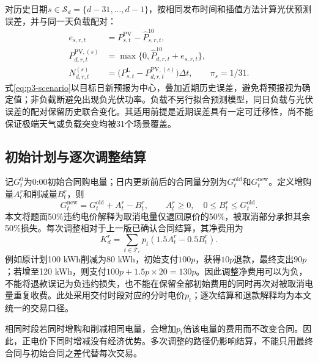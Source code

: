 对历史日期$s\in\mathcal S_d=\{d-31,\ldots,d-1\}$，按相同发布时间和插值方法计算光伏预测误差，并与同一天负载配对：
\begin{align}
e_{s,r,t}&=P^{\mathrm{PV}}_{s,t}-\widehat P^{10}_{s,r,t},\\
P^{\mathrm{PV},(s)}_{d,r,t}&=\max\{0,\widehat P^{10}_{d,r,t}+e_{s,r,t}\},\\
N^{(s)}_{d,r,t}&=\bigl(P^{\mathrm L}_{s,t}-P^{\mathrm{PV},(s)}_{d,r,t}\bigr)\Delta t,
\qquad \pi_s=1/31.\label{eq:p3-scenario}
\end{align}
式\eqref{eq:p3-scenario}以目标日新预报为中心，叠加近期历史误差，避免将预报视为确定值；非负截断避免出现负光伏功率。负载不另行拟合预测模型，同日负载与光伏误差的配对保留历史联合变化。其适用前提是近期误差具有一定可迁移性，尚不能保证极端天气或负载突变均被31个场景覆盖。

\subsection{初始计划与逐次调整结算}
记$G^0_t$为0:00初始合同购电量；日内更新前后的合同量分别为$G^{\mathrm{old}}_t$和$G^{\mathrm{new}}_t$。定义增购量$A^r_t$和削减量$B^r_t$，则
\begin{equation}
G^{\mathrm{new}}_t=G^{\mathrm{old}}_t+A^r_t-B^r_t,
\qquad A^r_t\geq0,\quad 0\leq B^r_t\leq G^{\mathrm{old}}_t.
\label{eq:p3-contract}
\end{equation}
本文将题面50\%违约电价解释为取消电量仅退回原价的50\%，被取消部分承担其余50\%损失。每次调整相对于上一版已确认合同结算，其净费用为
\begin{equation}
K_d^r=\sum_{t\in\mathcal T_r}p_t(1.5A^r_t-0.5B^r_t).
\label{eq:p3-cash}
\end{equation}
例如原计划100 kWh削减为80 kWh，初始支付$100p$，获得$10p$退款，最终支出$90p$；若增至120 kWh，则支付$100p+1.5p\times20=130p$。因此调整净费用可以为负，不能将退款误记为负违约损失，也不能在保留全部初始费用的同时再次对被取消电量重复收费。此处采用交付时段对应的分时电价$p_t$；逐次结算和退款解释均为本文统一的交易口径。

相同时段若同时增购和削减相同电量，会增加$p_t$倍该电量的费用而不改变合同。因此，正电价下同时增减没有经济优势。多次调整的路径仍影响结算，不能只用最终合同与初始合同之差代替每次交易。

